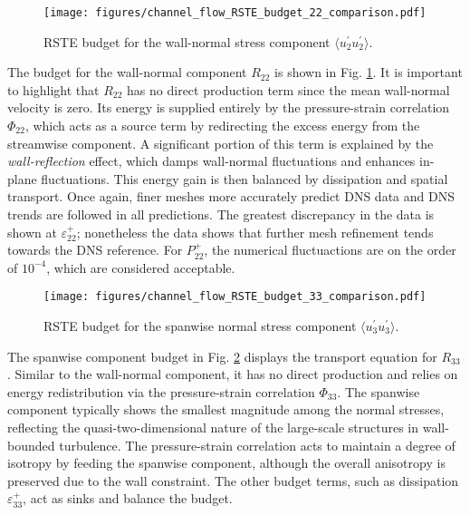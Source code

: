 \begin{figure}[ht]
    \centering
    \texttt{[image: figures/channel\_flow\_RSTE\_budget\_22\_comparison.pdf]}
    \caption{RSTE budget for the wall-normal stress component $\langle u^{\prime}_2 u^{\prime}_2 \rangle$.}
    \label{fig:chan_vv_RSTE}
\end{figure}

The budget for the wall-normal component $R_{22}$ is shown in Fig. \ref{fig:chan_vv_RSTE}. It is important to highlight that $R_{22}$ has no direct production term since the mean wall-normal velocity is zero. Its energy is supplied entirely by the pressure-strain correlation $\Phi_{22}$, which acts as a source term by redirecting the excess energy from the streamwise component. A significant portion of this term is explained by the \textit{wall-reflection} effect, which damps wall-normal fluctuations and enhances in-plane fluctuations. This energy gain is then balanced by dissipation and spatial transport. Once again, finer meshes more accurately predict DNS data and DNS trends are followed in all predictions. The greatest discrepancy in the data is shown at $\varepsilon^{+}_{22}$; nonetheless the data shows that further mesh refinement tends towards the DNS reference. For $P^{+}_{22}$, the numerical fluctuactions are on the order of $10^{-4}$, which are considered acceptable.

\begin{figure}[ht]
    \centering
    \texttt{[image: figures/channel\_flow\_RSTE\_budget\_33\_comparison.pdf]}
    \caption{RSTE budget for the spanwise normal stress component $\langle u^{\prime}_3 u^{\prime}_3 \rangle$.}
    \label{fig:chan_ww_RSTE}
\end{figure}

The spanwise component budget in Fig. \ref{fig:chan_ww_RSTE} displays the transport equation for $R_{33}$. Similar to the wall-normal component, it has no direct production and relies on energy redistribution via the pressure-strain correlation $\Phi_{33}$. The spanwise component typically shows the smallest magnitude among the normal stresses, reflecting the quasi-two-dimensional nature of the large-scale structures in wall-bounded turbulence. The pressure-strain correlation acts to maintain a degree of isotropy by feeding the spanwise component, although the overall anisotropy is preserved due to the wall constraint. The other budget terms, such as dissipation $\varepsilon^+_{33}$, act as sinks and balance the budget.


